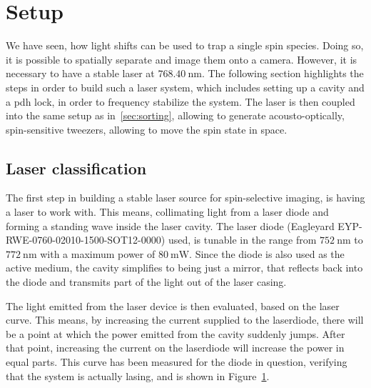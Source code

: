 \section{Setup}

We have seen, how light shifts can be used to trap a single spin species. Doing so, it is possible to spatially separate and image them onto a camera. However, it is necessary to have a stable laser at $\SI{768.40}{\nano\meter}$. The following section highlights the steps in order to build such a laser system, which includes setting up a cavity and a \ac{pdh} lock, in order to frequency stabilize the system. The laser is then coupled into the same setup as in~\ref{sec:sorting}, allowing to generate acousto-optically, spin-sensitive tweezers, allowing to move the spin state in space.

\subsection{Laser classification}

The first step in building a stable laser source for spin-selective imaging, is having a laser to work with. This means, collimating light from a laser diode and forming a standing wave inside the laser cavity. The laser diode (Eagleyard EYP-RWE-0760-02010-1500-SOT12-0000) used, is tunable in the range from $\SI{752}{\nano\meter}$ to $\SI{772}{\nano\meter}$ with a maximum power of $\SI{80}{\milli\watt}$. Since the diode is also used as the active medium, the cavity simplifies to being just a mirror, that reflects back into the diode and transmits part of the light out of the laser casing.

The light emitted from the laser device is then evaluated, based on the laser curve. This means, by increasing the current supplied to the laserdiode, there will be a point at which the power emitted from the cavity suddenly jumps. After that point, increasing the current on the laserdiode will increase the power in equal parts. This curve has been measured for the diode in question, verifying that the system is actually lasing, and is shown in Figure~\ref{fig:laser_curve}.

\begin{figure}[t]%
\label{fig:laser_curve}
\end{figure}

